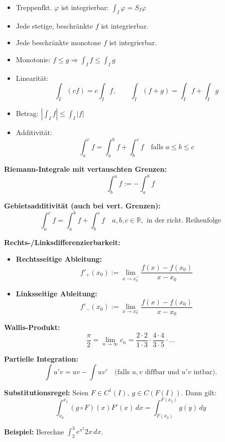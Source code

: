 \begin{itemize}
\begin{itemize}
  \item Treppenfkt. \( \varphi \) ist integrierbar: \( \int_I \varphi = S_I \varphi \)

  \item Jede stetige, beschränkte \( f \) ist integrierbar.

  \item Jede beschränkte monotone \( f \) ist integrierbar.

  \item Monotonie: \( f \le g \Rightarrow \int_I f \le \int_I g \)

  \item Linearität:
  \[
    \int_I (cf) = c \int_I f, \qquad \int_I (f+g) = \int_I f + \int_I g
  \]

  \item Betrag: \( \left| \int_I f \right| \le \int_I |f| \)

  \item Additivität:
  \[
    \int_a^c f = \int_a^b f + \int_b^c f \quad \text{falls } a \le b \le c
  \]
\end{itemize}

\textbf{Riemann-Integrale mit vertauschten Grenzen:}
\[
\int_b^a f := - \int_a^b f
\]

\textbf{Gebietsadditivität (auch bei vert. Grenzen):}
\[
\int_a^c f = \int_a^b f + \int_b^c f
\quad a, b, c \in \mathbb{R}, \text{ in der richt. Reihenfolge}
\]

\textbf{Rechts-/Linksdifferenzierbarkeit:}
\begin{itemize}
  \item \textbf{Rechtsseitige Ableitung:}
  \[
  f'_{+}(x_0) := \lim_{x \to x_0^+} \frac{f(x) - f(x_0)}{x - x_0}
  \]
  \item \textbf{Linksseitige Ableitung:}
  \[
  f'_{-}(x_0) := \lim_{x \to x_0^-} \frac{f(x) - f(x_0)}{x - x_0}
  \]
\end{itemize}

\textbf{Wallis-Produkt:}
\[
\frac{\pi}{2} = \lim_{n \to \infty} c_n = \frac{2 \cdot 2}{1 \cdot 3} \cdot \frac{4 \cdot 4}{3 \cdot 5} \cdot \ldots
\]


\textbf{Partielle Integration:}
\[
\int u'v = uv - \int uv'
\quad \text{(falls } u,v \text{ diffbar und } u'v \text{ intbar).}
\]

\textbf{Substitutionsregel:} Seien $F \in C^1(I),\ g \in C(F(I))$. Dann gilt:
\[
\int_{x_0}^{x_1} (g \circ F)(x) F'(x)\, dx = \int_{F(x_0)}^{F(x_1)} g(y)\, dy
\]

\textbf{Beispiel:} Berechne $\int_2^3 e^{x^2} 2x \, dx$.


\end{itemize}
